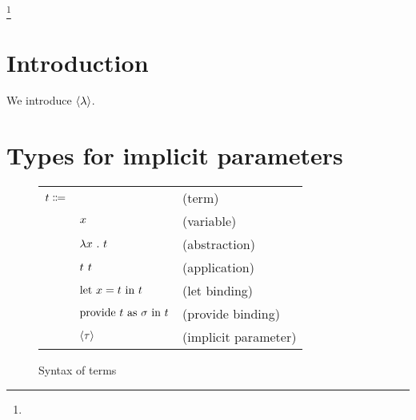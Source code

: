 \documentclass[acmlarge]{acmart}
\begin{document}
\newcommand\tmono{\tau}
\newcommand\tpoly{\sigma}
\newcommand\tvarempty{\epsilon_{\tpoly}}
\newcommand\tvar{\alpha}
\newcommand\tarrow[2]{#1 \rightarrow #2}
\newcommand\tforall[3]{\forall #1 \ . \ #2 \Rightarrow #3}
\newcommand\tgen[3]{\text{gen}\parens{#1, #2, #3}}
\newcommand\tinst[1]{\text{inst}(#1)}
\newcommand\tmgu[2]{\text{mgu}\parens{#1, #2}}

\newcommand\gcontext{\Gamma}
\newcommand\gempty{\epsilon_{\gcontext}}
\newcommand\gconcat[2]{#1 \mathbin{+\!+} #2}

\newcommand\icontext{\Delta}
\newcommand\iempty{\epsilon_{\icontext}}
\newcommand\iconcat[2]{#1 \mathbin{+\!+} #2}

\newcommand\ssub{\theta}
\newcommand\sempty{\epsilon_{\ssub}}
\newcommand\sub[3]{#1 \left[ #2 \mapsto #3 \right]}
\newcommand\slub[2]{#1 \vee #2}

\newcommand\utrans[2]{#1 \leadsto #2}
\newcommand\uelab[2]{#1 \hookrightarrow #2}
\newcommand\utovar[1]{\| #1 \|}



\terms{}



\thanks{
}


\maketitle

\section{Introduction}

  We introduce $\left\langle\lambda\right\rangle$.

\section{Types for implicit parameters}

  \begin{figure}[h!]
    \begin{mdframed}

      \begin{tabular}{l l l}
        $t \Coloneqq $ & & (term) \\
        & $x$ & (variable) \\
        & $\lambda x \ . \ t$ & (abstraction) \\
        & $t \ t$ & (application) \\
        & $\text{let } x = t \text{ in } t$ & (let binding) \\
        & $\lprovide{\lterm}{\tpoly}{\lterm}$ & (provide binding) \\
        & $\limplicit{\tmono}$ & (implicit parameter)
      \end{tabular}

    \end{mdframed}
    \caption{Syntax of terms}
    \label{fig:terms_syntax}
  \end{figure}
\end{document}
